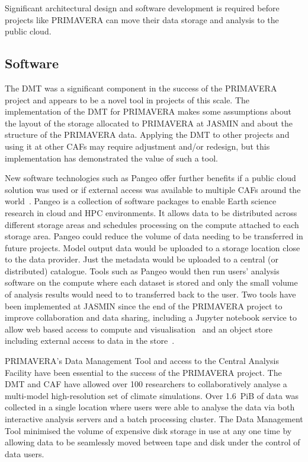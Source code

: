 \documentclass[gmd, manuscript]{copernicus}
\begin{document}
Significant architectural design and software development is required before projects like PRIMAVERA can move their data storage and analysis to the public cloud.

\subsection{Software}

The DMT was a significant component in the success of the PRIMAVERA project and appears to be a novel tool in projects of this scale. The implementation of the DMT for PRIMAVERA makes some assumptions about the layout of the storage allocated to PRIMAVERA at JASMIN and about the structure of the PRIMAVERA data. Applying the DMT to other projects and using it at other CAFs may require adjustment and/or redesign, but this implementation has demonstrated the value of such a tool.

New software technologies such as Pangeo offer further benefits if a public cloud solution was used or if external access was available to multiple CAFs around the world~\citep{Pangeo}. Pangeo is a collection of software packages to enable Earth science research in cloud and HPC environments. It allows data to be distributed across different storage areas and schedules processing on the compute attached to each storage area. Pangeo could reduce the volume of data needing to be transferred in future projects. Model output data would be uploaded to a storage location close to the data provider. Just the metadata would be uploaded to a central (or distributed) catalogue. Tools such as Pangeo would then run users' analysis software on the compute where each dataset is stored and only the small volume of analysis results would need to to transferred back to the user. Two tools have been implemented at JASMIN since the end of the PRIMAVERA project to improve collaboration and data sharing, including a Jupyter notebook service to allow web based access to compute and visualisation~\citep{JasminJupyter} and an object store including external access to data in the store~\citep{JasminObjectStore}. 

\conclusions  %

PRIMAVERA's Data Management Tool and access to the Central Analysis Facility have been essential to the success of the PRIMAVERA project. The DMT and CAF have allowed over 100 researchers to collaboratively analyse a multi-model high-resolution set of climate simulations. Over 1.6~PiB of data was collected in a single location where users were able to analyse the data via both interactive analysis servers and a batch processing cluster. The Data Management Tool minimised the volume of expensive disk storage in use at any one time by allowing data to be seamlessly moved between tape and disk under the control of data users.
\end{document}
